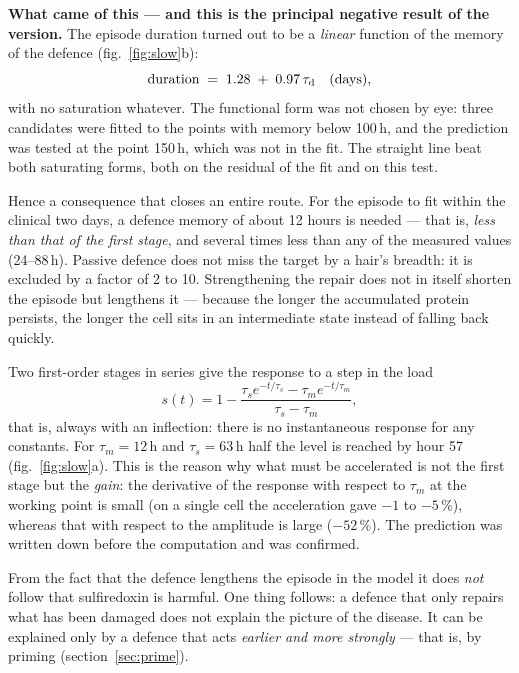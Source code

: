 \textbf{What came of this --- and this is the principal negative result of the version.} The episode duration turned out to be a \emph{linear} function of the memory of the defence (fig.~\ref{fig:slow}b):
\[\text{duration}\;=\;1.28\;+\;0.97\,\tau_{\rm d}\quad\text{(days)},\]
with no saturation whatever. The functional form was not chosen by eye: three candidates were fitted to the points with memory below 100\,h, and the prediction was tested at the point 150\,h, which was not in the fit. The straight line beat both saturating forms, both on the residual of the fit and on this test.

Hence a consequence that closes an entire route. For the episode to fit within the clinical two days, a defence memory of about 12 hours is needed --- that is, \emph{less than that of the first stage}, and several times less than any of the measured values (24--88\,h). Passive defence does not miss the target by a hair's breadth: it is excluded by a factor of 2 to 10. Strengthening the repair does not in itself shorten the episode but lengthens it --- because the longer the accumulated protein persists, the longer the cell sits in an intermediate state instead of falling back quickly.

\begin{ineq}
Two first-order stages in series give the response to a step in the load
\[s(t)=1-\frac{\tau_s e^{-t/\tau_s}-\tau_m e^{-t/\tau_m}}{\tau_s-\tau_m},\]
that is, always with an inflection: there is no instantaneous response for any constants. For $\tau_m=12$\,h and $\tau_s=63$\,h half the level is reached by hour 57 (fig.~\ref{fig:slow}a). This is the reason why what must be accelerated is not the first stage but the \emph{gain}: the derivative of the response with respect to $\tau_m$ at the working point is small (on a single cell the acceleration gave $-1$ to $-5$\,\%), whereas that with respect to the amplitude is large ($-52$\,\%). The prediction was written down before the computation and was confirmed.
\end{ineq}

\begin{note}
From the fact that the defence lengthens the episode in the model it does \emph{not} follow that sulfiredoxin is harmful. One thing follows: a defence that only repairs what has been damaged does not explain the picture of the disease. It can be explained only by a defence that acts \emph{earlier and more strongly} --- that is, by priming (section~\ref{sec:prime}).
\end{note}
